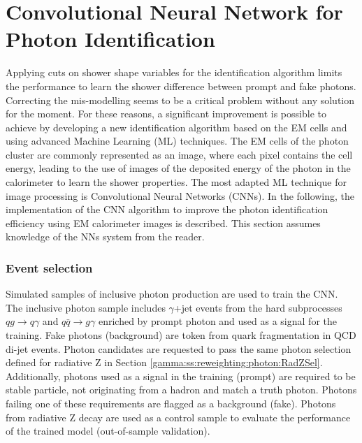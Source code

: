 \section{Convolutional Neural Network for Photon Identification}
\label{gamma:CNN}
Applying cuts on shower shape variables for the identification algorithm limits the performance to learn the shower difference between prompt and fake photons. Correcting the mis-modelling seems to be a critical problem without any solution for the moment. For these reasons, a significant improvement is possible to achieve by developing a new identification algorithm based on the EM cells and using advanced Machine Learning (ML) techniques. The EM cells of the photon cluster are commonly represented as an image, where each pixel contains the cell energy, leading to the use of images of the deposited energy of the photon in the calorimeter to learn the shower properties. The most adapted ML technique for image processing is Convolutional Neural Networks (CNNs). In the following, the implementation of the CNN algorithm to improve the photon identification efficiency using EM calorimeter images is described. This section assumes knowledge of the NNs system from the reader. 

\subsubsection{Event selection}
Simulated samples of inclusive photon production are used to train the CNN. The inclusive photon sample includes $\gamma$+jet events from the hard subprocesses $qg \rightarrow q\gamma$ and $ q\bar{q}\rightarrow g\gamma$ enriched by prompt photon and used as a signal for the training. Fake photons (background) are token from quark fragmentation in QCD di-jet events. Photon candidates are requested to pass the same photon selection defined for radiative Z in Section \ref{gamma:ss:reweighting:photon:RadZSel}. Additionally, photons used as a signal in the training (prompt) are required to be stable particle, not originating from a hadron and match a truth photon. Photons failing one of these requirements are flagged as a background (fake). Photons from radiative Z decay are used as a control sample to evaluate the performance of the trained model (out-of-sample validation).

